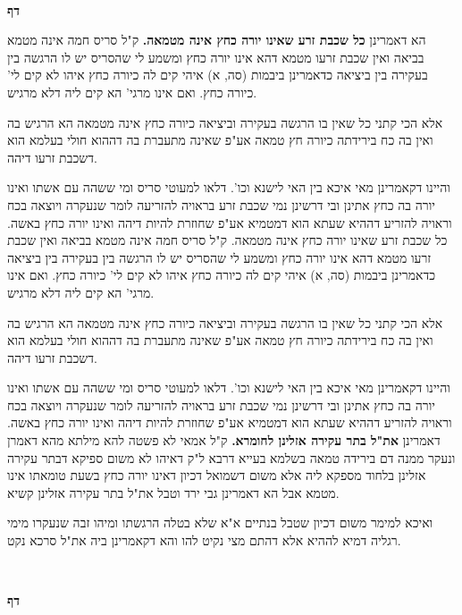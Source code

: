 \documentclass[12pt, openany]{book}
\newcommand{\sethebfont}{
\fontsize{10.5pt}{21.0pt} \selectfont
}
\newcommand{\twocol}[1]{
	{\sethebfont \begin{multicols}{2}
			#1
	\end{multicols}}	
}
\newcommand{\textblock}[1]{
{\sethebfont #1\\}	
}
\newcommand{\chapname}{}
\newcommand{\newchap}[1]{
	\addcontentsline{toc}{chapter}{#1}
	\renewcommand{\chapname}{#1}
		\begin{center}
			\textbf{%
\fontsize{16pt}{16pt}\selectfont
				#1}
		\end{center}
}
\begin{document}
\textblock{}{}
\newchap{דף }
\twocol{הא דאמרינן \textbf{כל שכבת זרע שאינו יורה כחץ אינה מטמאה.}  ק"ל סריס חמה אינה מטמא בביאה ואין שכבת זרעו מטמא דהא אינו יורה כחץ ומשמע לי שהסריס יש לו הרגשה בין בעקירה בין ביציאה כדאמרינן ביבמות (סה, א) איהי קים לה כיורה כחץ איהו לא קים לי' כיורה כחץ. ואם אינו מרגי' הא קים ליה דלא מרגיש.\par  אלא הכי קתני כל שאין בו הרגשה בעקירה וביציאה כיורה כחץ אינה מטמאה הא הרגיש בה ואין בה כח בירידתה כיורה חץ טמאה אע"פ שאינה מתעברת בה דההוא חולי בעלמא הוא דשכבת זרעו דיהה.\par  והיינו דקאמרינן מאי איכא בין האי לישנא וכו'. דלאו למעוטי סריס ומי ששהה עם אשתו ואינו יורה בה כחץ אתינן ובי דרשינן נמי שכבת זרע בראויה להזריעה לומר שנעקרה ויוצאה בכח וראויה להזריע דההיא שעתא הוא דמטמיא אע"פ שחוזרת להיות דיהה ואינו יורה כחץ באשה.  כל שכבת זרע שאינו יורה כחץ אינה מטמאה. ק"ל סריס חמה אינה מטמא בביאה ואין שכבת זרעו מטמא דהא אינו יורה כחץ ומשמע לי שהסריס יש לו הרגשה בין בעקירה בין ביציאה כדאמרינן ביבמות (סה, א) איהי קים לה כיורה כחץ איהו לא קים לי' כיורה כחץ. ואם אינו מרגי' הא קים ליה דלא מרגיש.\par  אלא הכי קתני כל שאין בו הרגשה בעקירה וביציאה כיורה כחץ אינה מטמאה הא הרגיש בה ואין בה כח בירידתה כיורה חץ טמאה אע"פ שאינה מתעברת בה דההוא חולי בעלמא הוא דשכבת זרעו דיהה.\par  והיינו דקאמרינן מאי איכא בין האי לישנא וכו'. דלאו למעוטי סריס ומי ששהה עם אשתו ואינו יורה בה כחץ אתינן ובי דרשינן נמי שכבת זרע בראויה להזריעה לומר שנעקרה ויוצאה בכח וראויה להזריע דההיא שעתא הוא דמטמיא אע"פ שחוזרת להיות דיהה ואינו יורה כחץ באשה. 
\parהא דאמרינן \textbf{את"ל בתר עקירה אזלינן לחומרא.}  ק"ל אמאי לא פשטה להא מילתא מהא דאמרן ונעקר ממנה דם בירידה טמאה בשלמא בעייא דרבא ל"ק דאיהו לא משום ספיקא דבתר עקירה אזלינן בלחוד מספקא ליה אלא משום דשמואל דכיון דאינו יורה כחץ בשעת טומאתו אינו מטמא אבל הא דאמרינן גבי ירד וטבל את"ל בתר עקירה אזלינן קשיא.\par  ואיכא למימר משום דכיון שטבל בנתיים א"א שלא בטלה הרגשתו ומיהו זבה שנעקרו מימי רגליה דמיא לההיא אלא דהתם מצי נקיט להו והא דקאמרינן ביה את"ל סרכא נקט. 
\par}
\textblock{}{}
\newchap{דף }
\end{document}
